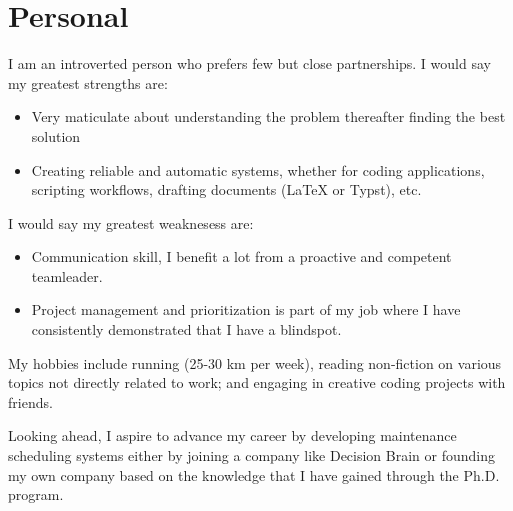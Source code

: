 \section{Personal}


I am an introverted person who prefers few but close partnerships. I would say my greatest strengths are:
\begin{itemize}
	\item Very maticulate about understanding the problem thereafter finding the best solution
	\item Creating reliable and automatic systems, whether for coding applications, scripting workflows, drafting documents (LaTeX or Typst), etc.
\end{itemize}

I would say my greatest weaknesess are:
\begin{itemize}
	\item Communication skill, I benefit a lot from a proactive and competent teamleader.
	\item Project management and prioritization is part of my job where I have consistently demonstrated that I have a blindspot.  
\end{itemize}
 

My hobbies include running (25-30 km per week), reading non-fiction on various topics not directly related to work; 
and engaging in creative coding projects with friends.

Looking ahead, I aspire to advance my career by developing maintenance scheduling systems
either by joining a company like Decision Brain or founding my own company based on the
knowledge that I have gained through the Ph.D. program.

